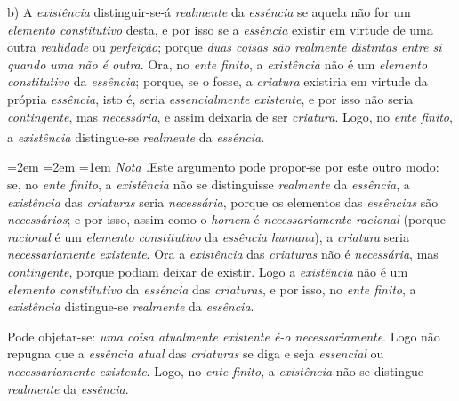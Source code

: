 \documentclass[12pt,a4paper]{article}
\newcommand{\subp}[1]{\medskip\noindent#1)\quad}
\renewcommand\footnote[1]{%
    \stepcounter{footnote}\textsuperscript{\thefootnote}%
    \par
    {\footnotesize
     \leftskip=2em \rightskip=2em \parindent=1em
     \addvspace{\medskipamount}%
     \noindent\textit{Nota \thefootnote.}\enspace #1\par
     \addvspace{\medskipamount}}%
  }
\begin{document}
\subp{b} A \emph{existência} distinguir-se-á \emph{realmente} da \emph{essência}
se aquela não for um \emph{elemento constitutivo} desta, e por isso se a
\emph{essência} existir em virtude de uma outra \emph{realidade} ou
\emph{perfeição}; porque \emph{duas coisas são realmente distintas entre si
quando uma não é outra}. Ora, no \emph{ente finito}, a \emph{existência} não é
um \emph{elemento constitutivo} da \emph{essência}; porque, se o fosse, a
\emph{criatura} existiria em virtude da própria \emph{essência}, isto é, seria
\emph{essencialmente existente}, e por isso não seria \emph{contingente}, mas
\emph{necessária}, e assim deixaria de ser \emph{criatura}. Logo, no \emph{ente
finito}, a \emph{existência} distingue-se \emph{realmente} da
\emph{essência}.\footnote{Este argumento pode propor-se por este outro modo: se,
no \emph{ente finito}, a \emph{existência} não se distinguisse \emph{realmente}
da \emph{essência}, a \emph{existência} das \emph{criaturas} seria
\emph{necessária}, porque os elementos das \emph{essências} são
\emph{necessários}; e por isso, assim como o \emph{homem} é
\emph{necessariamente racional} (porque \emph{racional} é um \emph{elemento
constitutivo} da \emph{essência humana}), a \emph{criatura} seria
\emph{necessariamente existente}. Ora a \emph{existência} das \emph{criaturas}
não é \emph{necessária}, mas \emph{contingente}, porque podiam deixar de
existir. Logo a \emph{existência} não é um \emph{elemento constitutivo} da
\emph{essência} das \emph{criaturas}, e por isso, no \emph{ente finito}, a
\emph{existência} distingue-se \emph{realmente} da \emph{essência}.

  Pode objetar-se: \emph{uma coisa atualmente existente é-o necessariamente}.
  Logo não repugna que a \emph{essência atual} das \emph{criaturas} se diga e
  seja \emph{essencial} ou \emph{necessariamente existente}. Logo, no \emph{ente
  finito}, a \emph{existência} não se distingue \emph{realmente} da
  \emph{essência}.

}
\end{document}
